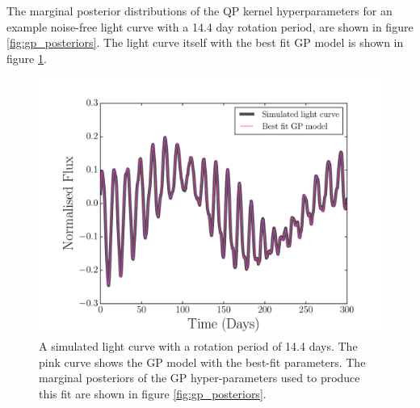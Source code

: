 \documentclass[useAMS, usenatbib, preprint, 12pt]{aastex}
\begin{document}
The marginal posterior distributions of the QP kernel hyperparameters for an
example noise-free light curve  with a 14.4 day rotation period, are shown in
figure \ref{fig:gp_posteriors}.
The light curve itself with the best fit GP model is shown in figure
\ref{fig:demo_lc_GP}.

\begin{figure}
\begin{center}
\includegraphics[width=6in, clip=true]{figures/demo_lc_GP.pdf}
\caption{A simulated light curve with a rotation period of 14.4 days.
The pink curve shows the GP model with the best-fit parameters.
The marginal posteriors of the GP hyper-parameters used to produce this fit
are shown in figure \ref{fig:gp_posteriors}.}
\label{fig:demo_lc_GP}
\end{center}
\end{figure}
\end{document}

